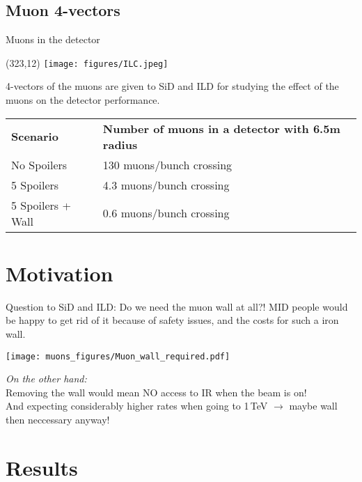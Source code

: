 \documentclass[xcolor={dvipsnames}]{beamer}
\newcommand{\ilclogo}{
  \setlength{\TPHorizModule}{1pt}
  \setlength{\TPVertModule}{1pt}
  \begin{textblock}{1}(323,12)
   \texttt{[image: figures/ILC.jpeg]}
  \end{textblock}
}
\begin{document}
\subsection{Muon 4-vectors}
\begin{frame}{Muons in the detector}
\ilclogo
4-vectors of the muons are given to SiD and ILD for studying the effect of the muons on the detector performance.\\
\vspace*{0.2cm}
\begin{tabular}{ll}
\textbf{Scenario} & \textbf{Number of muons in a detector with 6.5m radius}\\
 No Spoilers & 130 muons/bunch crossing\\
 5 Spoilers& 4.3 muons/bunch crossing\\
 5 Spoilers + Wall & 0.6 muons/bunch crossing
\end{tabular}
\end{frame}

\section{Motivation}
\begin{frame}{}
Question to SiD and ILD: Do we need the muon wall at all?!
MID people would be happy to get rid of it because of safety issues, and the costs for such a iron wall.
\begin{center}
\texttt{[image: muons\_figures/Muon\_wall\_required.pdf]}
\end{center}
\textit{On the other hand:}\\
Removing the wall would mean NO access to IR when the beam is on!\\
And expecting considerably higher rates when going to 1\,TeV $\rightarrow$ maybe wall then neccessary anyway!
\end{frame}

\section{Results}
\end{document}
